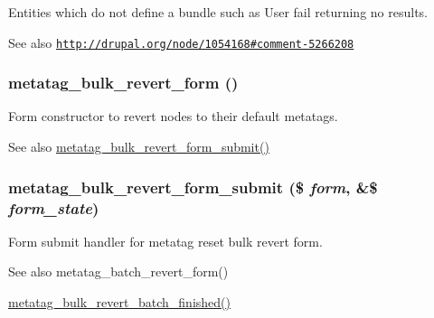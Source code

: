 Entities which do not define a bundle such as User fail returning no results. \begin{DoxySeeAlso}{See also}
\href{http://drupal.org/node/1054168#comment-5266208}{\tt http://drupal.org/node/1054168\#comment-\/5266208}
\end{DoxySeeAlso}
\hypertarget{metatag_8admin_8inc_a73f02a09e1068de6e28ae97baa10a041}{
\subsubsection[{metatag\_\-bulk\_\-revert\_\-form}]{\setlength{\rightskip}{0pt plus 5cm}metatag\_\-bulk\_\-revert\_\-form ()}}
\label{metatag_8admin_8inc_a73f02a09e1068de6e28ae97baa10a041}
Form constructor to revert nodes to their default metatags.

\begin{DoxySeeAlso}{See also}
\hyperlink{metatag_8admin_8inc_a175595665a6d1fead2df7b214a3845d8}{metatag\_\-bulk\_\-revert\_\-form\_\-submit()} 
\end{DoxySeeAlso}
\hypertarget{metatag_8admin_8inc_a175595665a6d1fead2df7b214a3845d8}{
\subsubsection[{metatag\_\-bulk\_\-revert\_\-form\_\-submit}]{\setlength{\rightskip}{0pt plus 5cm}metatag\_\-bulk\_\-revert\_\-form\_\-submit (\$ {\em form}, \/  \&\$ {\em form\_\-state})}}
\label{metatag_8admin_8inc_a175595665a6d1fead2df7b214a3845d8}
Form submit handler for metatag reset bulk revert form.

\begin{DoxySeeAlso}{See also}
metatag\_\-batch\_\-revert\_\-form() 

\hyperlink{metatag_8admin_8inc_a3fae24225b7ba1a63a6317b49c147094}{metatag\_\-bulk\_\-revert\_\-batch\_\-finished()} 
\end{DoxySeeAlso}
